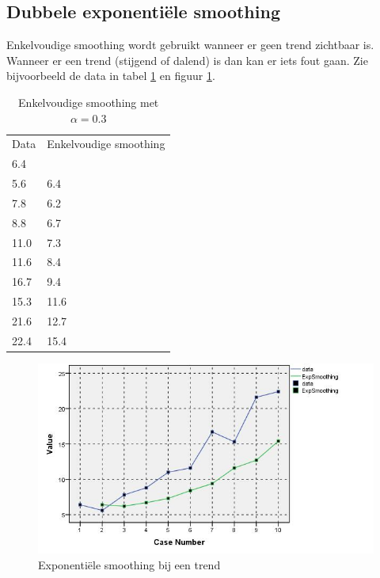 \subsection{Dubbele exponenti\"ele smoothing}
Enkelvoudige smoothing wordt gebruikt wanneer er geen trend zichtbaar is. Wanneer er een trend (stijgend of dalend) is dan kan er iets fout gaan. Zie bijvoorbeeld de data in tabel \ref{tab:trend} en figuur \ref{fig:tijdreeks61}.

\begin{table}[h]
\centering
    \begin{tabular}{|ll|}
    \hline
    Data & Enkelvoudige smoothing \\
    6.4  & ~                      \\
    5.6  & 6.4                    \\
    7.8  & 6.2                    \\
    8.8  & 6.7                    \\
    11.0 & 7.3                    \\
    11.6 & 8.4                    \\
    16.7 & 9.4                    \\
    15.3 & 11.6                   \\
    21.6 & 12.7                   \\
    22.4 & 15.4                   \\ \hline
    \end{tabular}
		\caption{Enkelvoudige smoothing met $\alpha = 0.3$}
		\label{tab:trend}
\end{table}

\begin{figure}[h]
	\centering
		\includegraphics[width=1.00\textwidth]{images/tijdsreeksen/tijdsreeks61.jpg}
	\caption{Exponenti\"ele smoothing bij een trend}
	\label{fig:tijdreeks61}
\end{figure}

